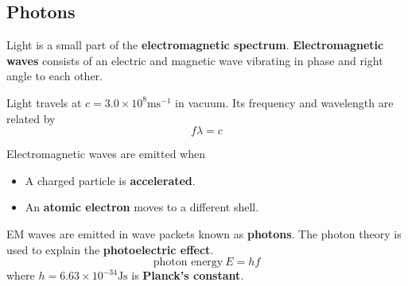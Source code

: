 \subsection{Photons}

Light is a small part of the \textbf{electromagnetic spectrum}. \textbf{Electromagnetic waves} consists of an electric and magnetic wave vibrating in phase and right angle to each other.

Light travels at $c=3.0\times10^8\text{ms}^{-1}$ in vacuum. Its frequency and wavelength are related by
$$f\lambda=c$$

Electromagnetic waves are emitted when
\begin{itemize}
    \item A charged particle is \textbf{accelerated}.
    \item An \textbf{atomic electron} moves to a different shell.
\end{itemize}

EM waves are emitted in wave packets known as \textbf{photons}. The photon theory is used to explain the \textbf{photoelectric effect}.
$$\text{photon energy}\ E=hf$$
where $h=6.63\times10^{-34}\text{Js}$ is \textbf{Planck's constant}.
